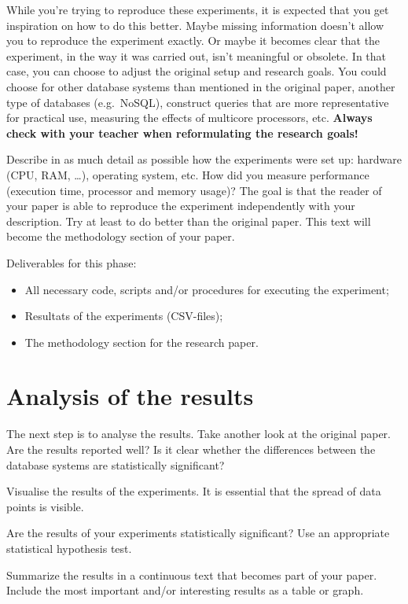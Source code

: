 \documentclass[fleqn,10pt]{artikeltin}
\begin{document}
While you're trying to reproduce these experiments, it is expected that you get inspiration on how to do this better. Maybe missing information doesn't allow you to reproduce the experiment exactly. Or maybe it becomes clear that the experiment, in the way it was carried out, isn't meaningful or obsolete. In that case, you can choose to adjust the original setup and research goals. You could choose for other database systems than mentioned in the original paper, another type of databases (e.g.~NoSQL), construct queries that are more representative for practical use, measuring the effects of multicore processors, etc. \textbf{Always check with your teacher when reformulating the research goals!}

Describe in as much detail as possible how the experiments were set up: hardware (CPU, RAM, \ldots), operating system, etc. How did you measure performance (execution time, processor and memory usage)? The goal is that the reader of your paper is able to reproduce the experiment independently with your description. Try at least to do better than the original paper. This text will become the methodology section of your paper.

Deliverables for this phase:

\begin{itemize}
	\item All necessary code, scripts and/or procedures for executing the experiment;
	\item Resultats of the experiments (CSV-files);
	\item The methodology section for the research paper.
\end{itemize}

\section{Analysis of the results}
\label{sec:analysis}

The next step is to analyse the results. Take another look at the original paper. Are the results reported well? Is it clear whether the differences between the database systems are statistically significant?

Visualise the results of the experiments. It is essential that the spread of data points is visible.

Are the results of your experiments statistically significant? Use an appropriate statistical hypothesis test.

Summarize the results in a continuous text that becomes part of your paper. Include the most important and/or interesting results as a table or graph.
\end{document}
